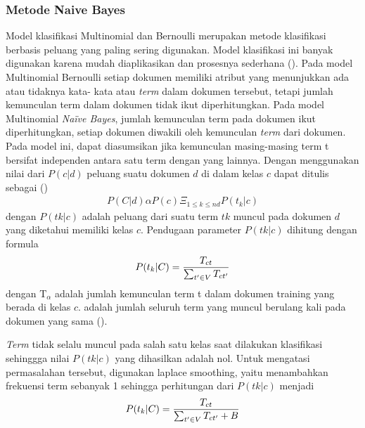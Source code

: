 \subsubsection*{Metode Naive Bayes}
Model klasifikasi Multinomial dan Bernoulli merupakan metode klasifikasi berbasis peluang yang paling sering digunakan. Model klasifikasi ini banyak digunakan karena mudah diaplikasikan dan prosesnya sederhana (\cite{MANNING2008}). Pada model Multinomial Bernoulli  setiap dokumen memiliki atribut yang menunjukkan ada atau tidaknya kata- kata atau \textit{term} dalam dokumen tersebut, tetapi jumlah kemunculan term dalam dokumen tidak ikut diperhitungkan. Pada model Multinomial \textit{Naïve Bayes}, jumlah kemunculan term pada dokumen ikut diperhitungkan, setiap dokumen diwakili oleh kemunculan \textit{term} dari dokumen. Pada model ini, dapat diasumsikan jika kemunculan masing-masing term t bersifat independen antara satu term dengan yang lainnya. Dengan menggunakan nilai dari $P(c|d)$ peluang suatu dokumen $d$ di dalam kelas $c$ dapat ditulis sebagai (\cite{MANNING2008}) 
\begin{equation}
\begin{split}
P(C|d) \alpha P(c) \Xi_{1\le k\le nd}P(t_k|c)
\label{eq:multinb}
\end{split}
\end{equation}
dengan $P(tk|c)$ adalah peluang dari suatu term $tk$ muncul pada dokumen $d$ yang diketahui memiliki kelas $c$. Pendugaan parameter $P (tk|c)$ dihitung dengan formula
\begin{equation}
\begin{split}
\tiny
P(t_k|C) = \frac{T_{ct}}{\sum _{t' \in V} T_{ct'}}
\label{eq:multinblanjut}
\normalsize
\end{split}
\end{equation}
dengan T$_\alpha$ adalah jumlah kemunculan term t dalam dokumen training yang berada di kelas $c$.  adalah jumlah seluruh term yang muncul berulang kali pada dokumen yang sama (\cite{MANNING2008}).

\textit{Term} tidak selalu muncul pada salah satu kelas saat dilakukan klasifikasi sehinggga nilai $P (tk|c)$ yang dihasilkan adalah nol. Untuk mengatasi permasalahan tersebut, digunakan laplace smoothing, yaitu menambahkan frekuensi term sebanyak 1 sehingga perhitungan dari $P(tk |c)$  menjadi 
\begin{equation}
\begin{split}
\tiny
P(t_k|C) = \frac{T_{ct}}{\sum _{t' \in V} T_{ct'} + B}
\label{eq:multinblanjutb}
\normalsize
\end{split}
\end{equation}

